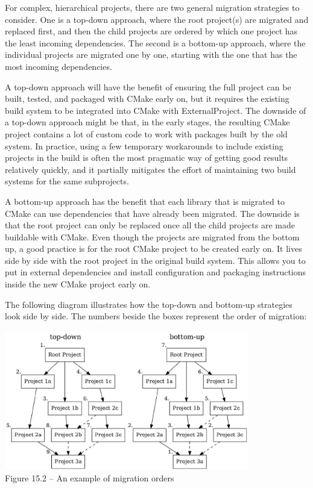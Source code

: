 For complex, hierarchical projects, there are two general migration strategies to consider. One is a top-down approach, where the root project(s) are migrated and replaced first, and then the child projects are ordered by which one project has the least incoming dependencies. The second is a bottom-up approach, where the individual projects are migrated one by one, starting with the one that has the most incoming dependencies.

A top-down approach will have the benefit of ensuring the full project can be built, tested, and packaged with CMake early on, but it requires the existing build system to be integrated into CMake with ExternalProject. The downside of a top-down approach might be that, in the early stages, the resulting CMake project contains a lot of custom code to work with packages built by the old system. In practice, using a few temporary workarounds to include existing projects in the build is often the most pragmatic way of getting good results relatively quickly, and it partially mitigates the effort of maintaining two build systems for the same subprojects.

A bottom-up approach has the benefit that each library that is migrated to CMake can use dependencies that have already been migrated. The downside is that the root project can only be replaced once all the child projects are made buildable with CMake. Even though the projects are migrated from the bottom up, a good practice is for the root CMake project to be created early on. It lives side by side with the root project in the original build system. This allows you to put in external dependencies and install configuration and packaging instructions inside the new CMake project early on.

The following diagram illustrates how the top-down and bottom-up strategies look side by side. The numbers beside the boxes represent the order of migration:

\begin{center}
\includegraphics[width=0.8\textwidth]{content/3/chapter15/images/2.jpg}\\
Figure 15.2 – An example of migration orders
\end{center}

